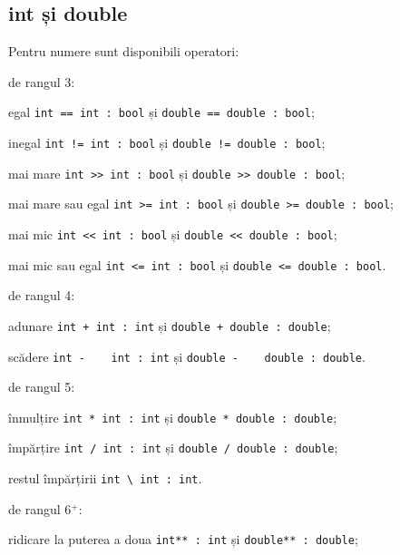\subsection{{\color{lightblue}int} și {\color{lightblue}double}}

Pentru numere sunt disponibili operatori:
\begin{icItems}
	\item
		de rangul 3:
		\begin{icItems}
			\item
				egal \lstinline|int == int : bool| și \lstinline|double == double : bool|;
			\item
				inegal \lstinline|int != int : bool| și \lstinline|double != double : bool|;
			\item
				mai mare \lstinline|int >> int : bool| și \lstinline|double >> double : bool|;
			\item
				mai mare sau egal \lstinline|int >= int : bool| și \lstinline|double >= double : bool|;
			\item
				mai mic \lstinline|int << int : bool| și \lstinline|double << double : bool|;
			\item
				mai mic sau egal \lstinline|int <= int : bool| și \lstinline|double <= double : bool|.
		\end{icItems}
	\item
		de rangul 4:
		\begin{icItems}
			\item
				adunare \lstinline|int + int : int| și \lstinline|double + double : double|;
			\item
				scădere \lstinline|int -    int : int| și \lstinline|double -    double : double|.
		\end{icItems}
	\item
		de rangul 5:
		\begin{icItems}
			\item
				înmulțire \lstinline|int * int : int| și \lstinline|double * double : double|;
			\item
				împărțire \lstinline|int / int : int| și \lstinline|double / double : double|;
			\item
				restul împărțirii \lstinline|int \ int : int|.
		\end{icItems}
	\item
		de rangul 6$^+$:
		\begin{icItems}
			\item
				ridicare la puterea a doua \lstinline|int** : int| și \lstinline|double** : double|;
			\item

\end{icItems}
\end{icItems}
